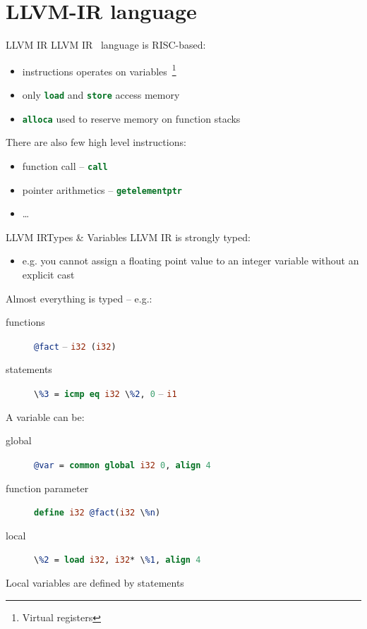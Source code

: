 \documentclass[10pt,mathserif]{beamer}
\newcommand{\llvminline}[1]{\lstinline[language=LLVM]!#1!}
\begin{document}

\section{LLVM-IR language}
\begin{frame}{LLVM IR}
	LLVM IR~\cite{LOCAL:www/llvmLanguageRef} language is RISC-based:
	
	\begin{itemize}
		\item instructions operates on \alert{variables}~\footnote{Virtual registers}
		\item only \llvminline{load} and \llvminline{store} access memory
		\item \llvminline{alloca} used to reserve memory on function stacks
	\end{itemize}
	\vfill
	There are also few \alert{high level instructions}:
	\begin{itemize}
		\item function call -- \llvminline{call}
		\item pointer arithmetics -- \llvminline{getelementptr}
		\item \ldots
	\end{itemize}
\end{frame}

\begin{frame}{LLVM IR}{Types \& Variables}
	LLVM IR is \alert{strongly typed}:
	
	\begin{itemize}
		\item e.g. you cannot assign a floating point value to an integer variable
		without an explicit cast
	\end{itemize}
	
	\alert{Almost everything} is \alert{typed} -- e.g.:
	
	\begin{description}
		\item[functions] \llvminline{@fact} -- \llvminline{i32 (i32)}
		\item[statements] \llvminline{\%3 = icmp eq i32 \%2, 0} -- \llvminline{i1}
	\end{description}
	
	A variable can be:
	
	\begin{description}
		\item[global] \llvminline{@var = common global i32 0, align 4}
		\item[function parameter] \llvminline{define i32 @fact(i32 \%n)}
		\item[local] \llvminline{\%2 = load i32, i32* \%1, align 4}
	\end{description}
	
	Local variables are defined by statements
\end{frame}
\end{document}
